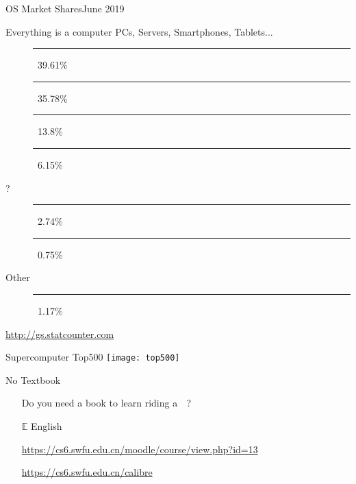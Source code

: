 \begin{frame}{OS Market Shares}{June 2019}
  \begin{block}{Everything is a computer}
    PCs, Servers, Smartphones, Tablets...
    \begin{description}
    \item[\android] \textcolor{Green}{\rule{.3961\textwidth}{2mm}}\,
      39.61\%
    \item[\win] \textcolor{SkyBlue}{\rule{.3578\textwidth}{2mm}}\, 35.78\%
    \item[{\iOS}] \textcolor{orange}{\rule{.138\textwidth}{2mm}}\, 13.8\%
    \item[\apple] \textcolor{LightGray}{\rule{.0615\textwidth}{2mm}}\, 6.15\%
    \item[?] \textcolor{gray}{\rule{.0274\textwidth}{2mm}}\, 2.74\%
    \item[\linux] \rule{.0075\textwidth}{2mm}\, 0.75\%
    \item[Other] \textcolor{gray}{\rule{.0117\textwidth}{2mm}}\, 1.17\%
    \end{description}
  \end{block}
  \begin{flushright}
    \scriptsize \url{http://gs.statcounter.com}
  \end{flushright}
\end{frame}

\begin{frame}{Supercomputer Top500}
  \centering\texttt{[image: top500]}
\end{frame}

\begin{frame}{No Textbook}%
  \begin{itemize}
  \item[\nerd{}] Do you need a book to learn riding a\hspace{.5ex} {\LARGE\nerd } ?%
  \item[{\GG}]\google
  \item[$\mathbb{E}$] {\purisa English}
  \item[\moodle] \url{https://cs6.swfu.edu.cn/moodle/course/view.php?id=13}
  \item[{\small\openbook}] \url{https://cs6.swfu.edu.cn/calibre}
  \end{itemize}
\end{frame}

